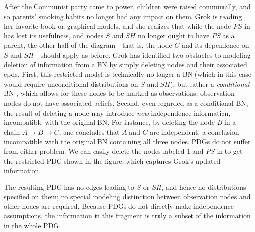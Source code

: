 \documentclass{article}
\theoremstyle{plain}
\theoremstyle{definition}
\theoremstyle{remark}
\numberwithin{equation}{section}
\begin{document}
\begin{example}[restriction]\label{ex:grok-ablate}
  After the Communist party came to power,
  children were raised communally, and so parents' smoking habits no longer had any impact on them. Grok is reading her favorite book on graphical models, and she realizes that while the node $\mathit{PS}$ in  has lost its usefulness, and nodes $S$ and $\mathit{SH}$ no longer ought to have $\mathit{PS}$ as a parent, the other half of the diagram---that is, the node $C$ and its dependence on $S$ and $\mathit{SH}$---should apply as before.
Grok has identified two obstacles to modeling deletion of information from a BN
by simply deleting nodes and their associated cpds. First, this restricted model
is technically no longer a BN (which in this case would require unconditional
distributions on $S$ and $\mathit{SH}$), but rather a \emph{conditional} BN
\cite{KF09}, which allows for these nodes to be marked as observations;
observation nodes do not have associated beliefs. Second, even regarded as a
conditional BN, the result of deleting a node may introduce \emph{new}
independence information, incompatible with the original BN. For instance, by
deleting the node $B$ in a chain $A \rightarrow B \rightarrow C$, one concludes
that $A$ and $C$ are independent, a conclusion incompatible with the original BN
containing all three nodes.   
PDGs do not suffer from either problem.  We can easily delete the
nodes labeled 1 and $PS$ in  to get the
restricted PDG shown in the figure, which captures Grok's updated information.
\begin{vfull}
The resulting PDG has no edges leading to $S$ or $\mathit{SH}$, and hence no
distributions specified on them; no special modeling distinction between
observation nodes and other nodes are required. Because PDGs do not directly
make independence assumptions, the information in this fragment is truly a
subset of the information in the whole PDG. 	
\end{vfull}
% 
\end{example}
\end{document}
